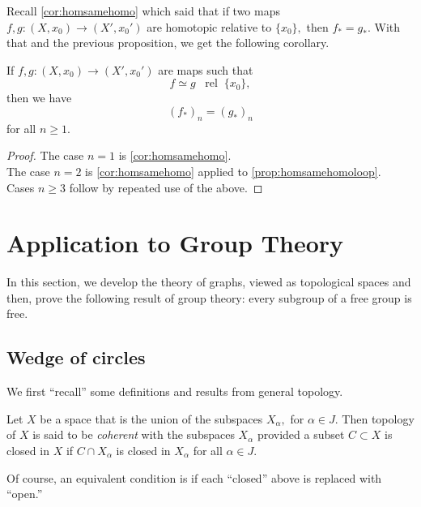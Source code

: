 \documentclass[12pt]{article}
\newcommand{\rel}{\;\;\operatorname{rel}\;}
\begin{document}
Recall \cref{cor:homsamehomo} which said that if two maps $f, g: (X, x_0) \to (X', x_0')$ are homotopic relative to $\{x_0\},$ then $f_* = g_*.$ With that and the previous proposition, we get the following corollary.

\begin{cor}
	If $f, g:(X, x_0) \to (X', x_0')$ are maps such that
	\begin{equation*} 
		f \simeq g \rel \{x_0\},
	\end{equation*}
	then we have
	\begin{equation*} 
		(f_*)_n = (g_*)_n
	\end{equation*}
	for all $n \ge 1.$
\end{cor}
\begin{proof} 
	The case $n = 1$ is \cref{cor:homsamehomo}. \\
	The case $n = 2$ is \cref{cor:homsamehomo} applied to \cref{prop:homsamehomoloop}.\\
	Cases $n \ge 3$ follow by repeated use of the above.
\end{proof}


\section{Application to Group Theory}
In this section, we develop the theory of graphs, viewed as topological spaces and then, prove the following result of group theory: every subgroup of a free group is free.

\subsection{Wedge of circles}
We first ``recall'' some definitions and results from general topology.

\begin{defn}
	Let $X$ be a space that is the union of the subspaces $X_\alpha,$ for $\alpha \in J.$ Then topology of $X$ is said to be \emph{coherent} with the subspaces $X_\alpha$ provided a subset $C \subset X$ is closed in $X$ if $C \cap X_\alpha$ is closed in $X_\alpha$ for all $\alpha \in J.$
\end{defn}
Of course, an equivalent condition is if each ``closed'' above is replaced with ``open.''
\end{document}
